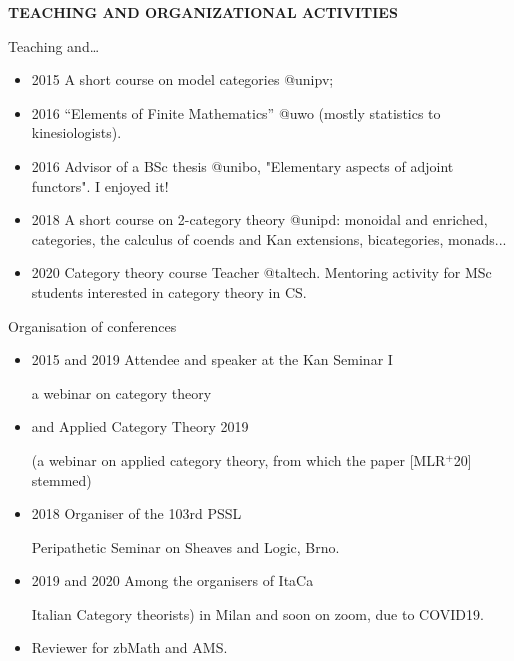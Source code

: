 \documentclass[handout]{beamer}
\def\lnk#1{\href{#1}{\faFilePdfO}}
\begin{document}
%
%
%
%
%
\begin{frame}
  \Huge\centering \bfseries TEACHING AND ORGANIZATIONAL ACTIVITIES
\end{frame}
%
\begin{frame}{Teaching and\dots}\small
  \begin{itemize}
    \item<+-> 2015 A short course on \alert{model categories} {\color{magenta} @unipv};
    \item<+-> 2016 ``\alert{Elements of Finite Mathematics}'' {\color{magenta} @uwo} (mostly statistics to kinesiologists).
    \item<+-> 2016 \alert{Advisor} of a BSc thesis {\color{magenta} @unibo}, "Elementary aspects of adjoint functors". I enjoyed it!
    \item<+-> 2018 A short course on \alert{2-category theory} {\color{magenta} @unipd}: monoidal and enriched, categories, the calculus of coends and Kan extensions, bicategories, monads...
    \item<+-> 2020 \alert{Category theory} course Teacher {\color{magenta} @taltech}. Mentoring activity for MSc students interested in category theory in CS.
\end{itemize}
\end{frame}
\begin{frame}{Organisation of conferences}\small
  \begin{itemize}
    \item<+-> 2015 and 2019 Attendee and speaker at the \alert{Kan Seminar I} 
    
    {\footnotesize\color{gray!40} a webinar on category theory}
    \item<+-> and \alert{Applied Category Theory} 2019 
    
    {\footnotesize\color{gray!40} (a webinar on applied category theory, from which the paper [\alert{MLR$^{+}$20}\lnk{https://arxiv.org/abs/2001.07488}] stemmed)}
    \item<+-> 2018 \alert{Organiser} of the 103rd \alert{PSSL}
    
    {\footnotesize\color{gray!40} Peripathetic Seminar on Sheaves and Logic, Brno.}
    \item<+-> 2019 and 2020 Among the \alert{organisers} of ItaCa 
    
    {\footnotesize\color{gray!40}  \alert{Ita}lian \alert{Ca}tegory theorists) in Milan and soon on zoom, due to COVID19.}
    \item<+-> Reviewer for zbMath and AMS.
  \end{itemize}
\end{frame}
\end{document}
